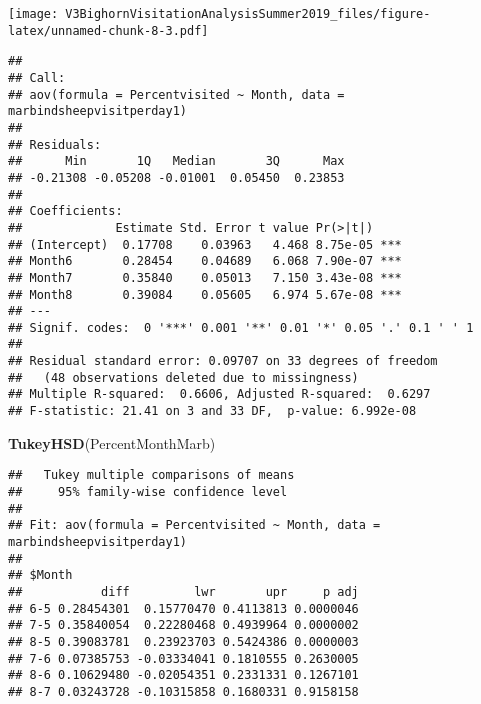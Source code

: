 \documentclass[]{article}
\newenvironment{Shaded}{\begin{snugshade}}{\end{snugshade}}
\newcommand{\DataTypeTok}[1]{\textcolor[rgb]{0.13,0.29,0.53}{#1}}
\newcommand{\KeywordTok}[1]{\textcolor[rgb]{0.13,0.29,0.53}{\textbf{#1}}}
\newcommand{\NormalTok}[1]{#1}
\newcommand{\OperatorTok}[1]{\textcolor[rgb]{0.81,0.36,0.00}{\textbf{#1}}}
\newcommand{\StringTok}[1]{\textcolor[rgb]{0.31,0.60,0.02}{#1}}
\begin{document}
\texttt{[image: V3BighornVisitationAnalysisSummer2019\_files/figure-latex/unnamed-chunk-8-3.pdf]}

\begin{Shaded}
\end{Shaded}

\begin{verbatim}
## 
## Call:
## aov(formula = Percentvisited ~ Month, data = marbindsheepvisitperday1)
## 
## Residuals:
##      Min       1Q   Median       3Q      Max 
## -0.21308 -0.05208 -0.01001  0.05450  0.23853 
## 
## Coefficients:
##             Estimate Std. Error t value Pr(>|t|)    
## (Intercept)  0.17708    0.03963   4.468 8.75e-05 ***
## Month6       0.28454    0.04689   6.068 7.90e-07 ***
## Month7       0.35840    0.05013   7.150 3.43e-08 ***
## Month8       0.39084    0.05605   6.974 5.67e-08 ***
## ---
## Signif. codes:  0 '***' 0.001 '**' 0.01 '*' 0.05 '.' 0.1 ' ' 1
## 
## Residual standard error: 0.09707 on 33 degrees of freedom
##   (48 observations deleted due to missingness)
## Multiple R-squared:  0.6606, Adjusted R-squared:  0.6297 
## F-statistic: 21.41 on 3 and 33 DF,  p-value: 6.992e-08
\end{verbatim}

\begin{Shaded}
\begin{Highlighting}[]
\KeywordTok{TukeyHSD}\NormalTok{(PercentMonthMarb)}
\end{Highlighting}
\end{Shaded}

\begin{verbatim}
##   Tukey multiple comparisons of means
##     95% family-wise confidence level
## 
## Fit: aov(formula = Percentvisited ~ Month, data = marbindsheepvisitperday1)
## 
## $Month
##           diff         lwr       upr     p adj
## 6-5 0.28454301  0.15770470 0.4113813 0.0000046
## 7-5 0.35840054  0.22280468 0.4939964 0.0000002
## 8-5 0.39083781  0.23923703 0.5424386 0.0000003
## 7-6 0.07385753 -0.03334041 0.1810555 0.2630005
## 8-6 0.10629480 -0.02054351 0.2331331 0.1267101
## 8-7 0.03243728 -0.10315858 0.1680331 0.9158158
\end{verbatim}
\end{document}
